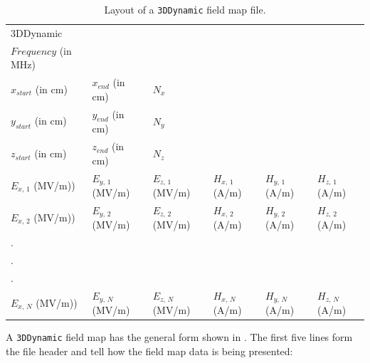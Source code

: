 \begin{table}[h!]
    \caption{Layout of a \texttt{3DDynamic} field map file.}
    \label{tab:3DDynamic}
    \begin{center}
    \begin{tabular}{llllll}
      \hline
      3DDynamic            &                    &                    &                   &                   &                   \\
      $Frequency$ (in MHz) &                    &                    &                   &                   &                   \\
      $x_{start}$ (in cm)  & $x_{end}$ (in cm)  & $N_{x}$            &                   &                   &                   \\
      $y_{start}$ (in cm)  & $y_{end}$ (in cm)  & $N_{y}$            &                   &                   &                   \\
      $z_{start}$ (in cm)  & $z_{end}$ (in cm)  & $N_{z}$            &                   &                   &                   \\
      $E_{x,\,1}$ (MV/m))  & $E_{y,\,1}$ (MV/m) & $E_{z,\,1}$ (MV/m) & $H_{x,\,1}$ (A/m) & $H_{y,\,1}$ (A/m) & $H_{z,\,1}$ (A/m) \\
      $E_{x,\,2}$ (MV/m))  & $E_{y,\,2}$ (MV/m) & $E_{z,\,2}$ (MV/m) & $H_{x,\,2}$ (A/m) & $H_{y,\,2}$ (A/m) & $H_{z,\,2}$ (A/m) \\
      .                    &                    &                    &                   &                   &                   \\
      .                    &                    &                    &                   &                   &                   \\
      .                    &                    &                    &                   &                   &                   \\
      $E_{x,\,N}$ (MV/m))  & $E_{y,\,N}$ (MV/m) & $E_{z,\,N}$ (MV/m) & $H_{x,\,N}$ (A/m) & $H_{y,\,N}$ (A/m) & $H_{z,\,N}$ (A/m) \\
      \hline
    \end{tabular}
    \end{center}
\end{table}

A \texttt{3DDynamic} field map has the general form shown in . The first five lines form
the file header and tell \opalt how the field map data is being presented:

